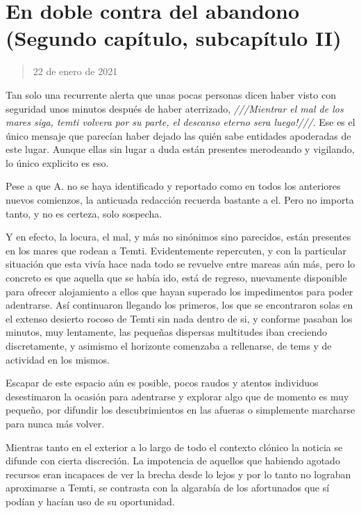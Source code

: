 \documentclass[
  spanish,
]{book}
\begin{document}
\hypertarget{en-doble-contra-del-abandono-segundo-capuxedtulo-subcapuxedtulo-ii}{%
\section{En doble contra del abandono (Segundo capítulo, subcapítulo II)}\label{en-doble-contra-del-abandono-segundo-capuxedtulo-subcapuxedtulo-ii}}

\begin{quote}
22 de enero de 2021
\end{quote}

Tan solo una recurrente alerta que unas pocas personas dicen haber visto con seguridad unos minutos después de haber aterrizado, \emph{///Mientrar el mal de los mares siga, temti volvera por su parte, el descanso eterno sera luego!///}. Ese es el único mensaje que parecían haber dejado las quién sabe entidades apoderadas de este lugar. Aunque ellas sin lugar a duda están presentes merodeando y vigilando, lo único explicito es eso.

Pese a que A. no se haya identificado y reportado como en todos los anteriores nuevos comienzos, la anticuada redacción recuerda bastante a el. Pero no importa tanto, y no es certeza, solo sospecha.

Y en efecto, la locura, el mal, y más no sinónimos sino parecidos, están presentes en los mares que rodean a Temti. Evidentemente repercuten, y con la particular situación que esta vivía hace nada todo se revuelve entre mareas aún más, pero lo concreto es que aquella que se había ido, está de regreso, nuevamente disponible para ofrecer alojamiento a ellos que hayan superado los impedimentos para poder adentrarse. Así continuaron llegando los primeros, los que se encontraron solas en el extenso desierto rocoso de Temti sin nada dentro de si, y conforme pasaban los minutos, muy lentamente, las pequeñas dispersas multitudes iban creciendo discretamente, y asimismo el horizonte comenzaba a rellenarse, de tems y de actividad en los mismos.

Escapar de este espacio aún es posible, pocos raudos y atentos individuos desestimaron la ocasión para adentrarse y explorar algo que de momento es muy pequeño, por difundir los descubrimientos en las afueras o simplemente marcharse para nunca más volver.

Mientras tanto en el exterior a lo largo de todo el contexto clónico la noticia se difunde con cierta discreción. La impotencia de aquellos que habiendo agotado recursos eran incapaces de ver la brecha desde lo lejos y por lo tanto no lograban aproximarse a Temti, se contrasta con la algarabía de los afortunados que sí podían y hacían uso de su oportunidad.
\end{document}
